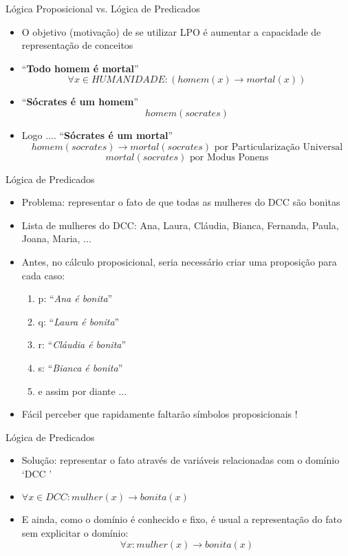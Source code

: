 \begin{frame}[t]{Lógica Proposicional vs. Lógica de Predicados}
	\begin{itemize} \itemsep 0.6cm
	\item O objetivo (motivação) de se utilizar LPO é aumentar a capacidade de representação de conceitos

	\item ``{\bf Todo homem é mortal}'' $$\forall x \in HUMANIDADE: (homem(x) \rightarrow mortal(x))$$

	\item ``{\bf Sócrates é um homem}'' $$homem(socrates)$$

	\item Logo .... ``{\bf Sócrates é um mortal}'' $$homem(socrates) \rightarrow mortal(socrates) \mbox{  por Particularização Universal}$$ $$mortal(socrates) \mbox{  por Modus Ponens}$$
	\end{itemize}
\end{frame}

\begin{frame}[t]{Lógica de Predicados}
	\begin{itemize} \itemsep 0.5cm
	\item Problema: representar o fato de que todas as mulheres do DCC são bonitas

	\item Lista de mulheres do DCC: Ana, Laura, Cláudia, Bianca, Fernanda, Paula, Joana, Maria, ...

	\item Antes, no cálculo proposicional, seria necessário criar uma proposição para cada caso:
	\begin{enumerate}
	\item p: ``{\it Ana é bonita}''
	\item q: ``{\it Laura é bonita}''
	\item r: ``{\it Cláudia é bonita}''
	\item s: ``{\it Bianca é bonita}''
	\item e assim por diante ...
	\end{enumerate}

	\item Fácil perceber que rapidamente faltarão símbolos proposicionais !
	\end{itemize}
\end{frame}


\begin{frame}[t]{Lógica de Predicados}
	\begin{itemize} \itemsep 0.5cm
	\item Solução: representar o fato através de variáveis relacionadas com o domínio `DCC '

	\item $\forall x \in DCC: mulher(x) \rightarrow bonita(x)$

	\item E ainda, como o domínio é conhecido e fixo, é usual a representação do fato sem explicitar o domínio: $$\forall x: mulher(x) \rightarrow bonita(x)$$
	\end{itemize}
\end{frame}



